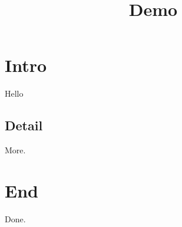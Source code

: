 \documentclass{article}
\title{Demo}
\begin{document}
\maketitle
\section{Intro}
Hello %
\subsection{Detail}
More.
\section{End}
Done.
\end{document}
